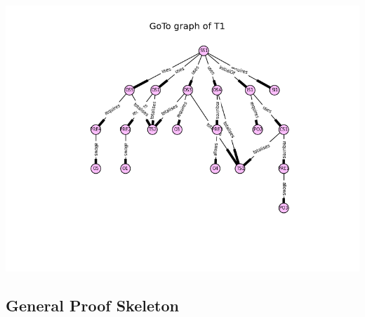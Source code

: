 \includegraphics[scale=0.7]{examples/bb/25b.png}
\subsection{General Proof Skeleton}
\label{app:bb3}

